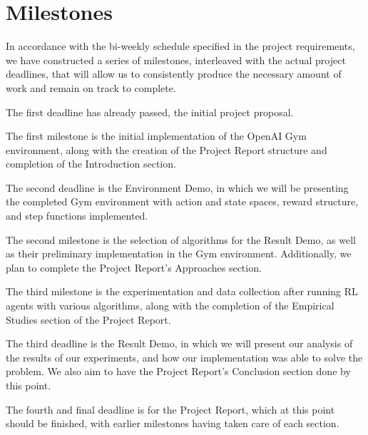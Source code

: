 \documentclass[../proposal.tex]{subfiles}
\begin{document}
\section{Milestones}
In accordance with the bi-weekly schedule specified in the project requirements, we have constructed a series of milestones, interleaved with the actual project deadlines, that will allow us to consistently produce the necessary amount of work and remain on track to complete.

The first deadline has already passed, the initial project proposal.

The first milestone is the initial implementation of the OpenAI Gym environment, along with the creation of the Project Report structure and completion of the Introduction section.

The second deadline is the Environment Demo, in which we will be presenting the completed Gym environment with action and state spaces, reward structure, and step functions implemented.

The second milestone is the selection of algorithms for the Result Demo, as well as their preliminary implementation in the Gym environment. Additionally, we plan to complete the Project Report's Approaches section.

The third milestone is the experimentation and data collection after running RL agents with various algorithms, along with the completion of the Empirical Studies section of the Project Report.

The third deadline is the Result Demo, in which we will present our analysis of the results of our experiments, and how our implementation was able to solve the problem. We also aim to have the Project Report's Conclusion section done by this point.

The fourth and final deadline is for the Project Report, which at this point should be finished, with earlier milestones having taken care of each section.
\label{milestones}
\end{document}
